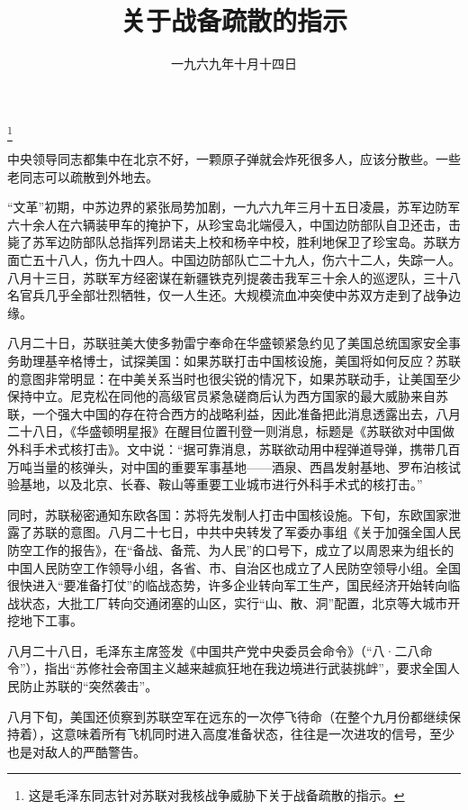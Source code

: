 
\title{关于战备疏散的指示}
\date{一九六九年十月十四日}
\thanks{这是毛泽东同志针对苏联对我核战争威胁下关于战备疏散的指示。}
\maketitle


中央领导同志都集中在北京不好，一颗原子弹就会炸死很多人，应该分散些。一些老同志可以疏散到外地去。

\begin{maonote}
“文革”初期，中苏边界的紧张局势加剧，一九六九年三月十五日凌晨，苏军边防军六十余人在六辆装甲车的掩护下，从珍宝岛北端侵入，中国边防部队自卫还击，击毙了苏军边防部队总指挥列昂诺夫上校和杨辛中校，胜利地保卫了珍宝岛。苏联方面亡五十八人，伤九十四人。中国边防部队亡二十九人，伤六十二人，失踪一人。八月十三日，苏联军方经密谋在新疆铁克列提袭击我军三十余人的巡逻队，三十八名官兵几乎全部壮烈牺牲，仅一人生还。大规模流血冲突使中苏双方走到了战争边缘。

八月二十日，苏联驻美大使多勃雷宁奉命在华盛顿紧急约见了美国总统国家安全事务助理基辛格博士，试探美国：如果苏联打击中国核设施，美国将如何反应？苏联的意图非常明显：在中美关系当时也很尖锐的情况下，如果苏联动手，让美国至少保持中立。尼克松在同他的高级官员紧急磋商后认为西方国家的最大威胁来自苏联，一个强大中国的存在符合西方的战略利益，因此准备把此消息透露出去，八月二十八日，《华盛顿明星报》在醒目位置刊登一则消息，标题是《苏联欲对中国做外科手术式核打击》。文中说：“据可靠消息，苏联欲动用中程弹道导弹，携带几百万吨当量的核弹头，对中国的重要军事基地——酒泉、西昌发射基地、罗布泊核试验基地，以及北京、长春、鞍山等重要工业城市进行外科手术式的核打击。”

同时，苏联秘密通知东欧各国：苏将先发制人打击中国核设施。下旬，东欧国家泄露了苏联的意图。八月二十七日，中共中央转发了军委办事组《关于加强全国人民防空工作的报告》，在“备战、备荒、为人民”的口号下，成立了以周恩来为组长的中国人民防空工作领导小组，各省、市、自治区也成立了人民防空领导小组。全国很快进入“要准备打仗”的临战态势，许多企业转向军工生产，国民经济开始转向临战状态，大批工厂转向交通闭塞的山区，实行“山、散、洞”配置，北京等大城市开挖地下工事。

八月二十八日，毛泽东主席签发《中国共产党中央委员会命令》（“八·二八命令”），指出“苏修社会帝国主义越来越疯狂地在我边境进行武装挑衅”，要求全国人民防止苏联的“突然袭击”。

八月下旬，美国还侦察到苏联空军在远东的一次停飞待命（在整个九月份都继续保持着），这意味着所有飞机同时进入高度准备状态，往往是一次进攻的信号，至少也是对敌人的严酷警告。


\end{maonote}
